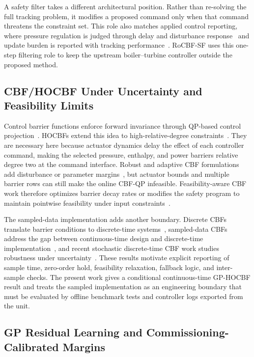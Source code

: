 A safety filter takes a different architectural position. Rather than re-solving the full tracking problem, it modifies a proposed command only when that command threatens the constraint set. This role also matches applied control reporting, where pressure regulation is judged through delay and disturbance response~\cite{wu2026pressure} and update burden is reported with tracking performance~\cite{feng2026event}. RoCBF-SF uses this one-step filtering role to keep the upstream boiler--turbine controller outside the proposed method.

\subsection{CBF/HOCBF Under Uncertainty and Feasibility Limits}

Control barrier functions enforce forward invariance through QP-based control projection~\cite{wieland2007constructive,ames2017cbf}. HOCBFs extend this idea to high-relative-degree constraints~\cite{xiao2021hocbf}. They are necessary here because actuator dynamics delay the effect of each controller command, making the selected pressure, enthalpy, and power barriers relative degree two at the command interface. Robust and adaptive CBF formulations add disturbance or parameter margins~\cite{jankovic2018robust,taylor2020issf,long2023ecbf}, but actuator bounds and multiple barrier rows can still make the online CBF-QP infeasible. Feasibility-aware CBF work therefore optimizes barrier decay rates or modifies the safety program to maintain pointwise feasibility under input constraints~\cite{zeng2021optimal}.

The sampled-data implementation adds another boundary. Discrete CBFs translate barrier conditions to discrete-time systems~\cite{agrawal2017discrete}, sampled-data CBFs address the gap between continuous-time design and discrete-time implementation~\cite{taylor2022sampled}, and recent stochastic discrete-time CBF work studies robustness under uncertainty~\cite{cosner2023robust}. These results motivate explicit reporting of sample time, zero-order hold, feasibility relaxation, fallback logic, and inter-sample checks. The present work gives a conditional continuous-time GP-HOCBF result and treats the sampled implementation as an engineering boundary that must be evaluated by offline benchmark tests and controller logs exported from the unit.

\subsection{GP Residual Learning and Commissioning-Calibrated Margins}

